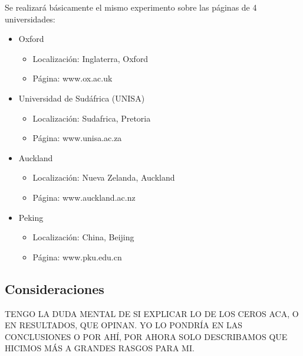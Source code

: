 \newpage


Se realizará básicamente el mismo experimento sobre las páginas de 4 universidades:

\begin{itemize}
	\item Oxford
	
	\begin{itemize}
		\item Localización: Inglaterra, Oxford 
		\item Página: www.ox.ac.uk
	\end{itemize}

	\item Universidad de Sudáfrica (UNISA)
	
	\begin{itemize}
		\item Localización: Sudafrica, Pretoria
		\item Página: www.unisa.ac.za
	\end{itemize}
		 
	\item Auckland
	 
	\begin{itemize}
		\item Localización: Nueva Zelanda, Auckland 
		\item Página: www.auckland.ac.nz
	\end{itemize}

	\item Peking
	 
	\begin{itemize}
		\item Localización: China, Beijing 
		\item Página: www.pku.edu.cn
	\end{itemize}

\end{itemize}


\subsection{Consideraciones}

TENGO LA DUDA MENTAL DE SI EXPLICAR LO DE LOS CEROS ACA, O EN RESULTADOS, QUE OPINAN. 
YO LO PONDRÍA EN LAS CONCLUSIONES O POR AHÍ, POR AHORA SOLO DESCRIBAMOS QUE HICIMOS MÁS A GRANDES RASGOS PARA MI.